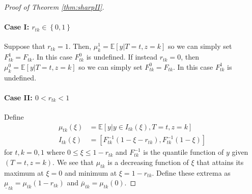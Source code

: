 \begin{proof}[Proof of Theorem \ref{thm:sharpII}]

\paragraph{Case I: $r_{tk}\in \left\{ 0,1 \right\}$}
Suppose that $r_{tk} = 1$.
Then, $\mu^1_k = \mathbb{E}[y|T=t,z=k]$ so we can simply set $F^1_{tk} = F_{tk}$.
In this case $F^0_{tk}$ is undefined.
If instead $r_{tk} = 0$, then $\mu^0_k = \mathbb{E}[y|T=t,z=k]$ so we can simply set $F^0_{tk} = F_{tk}$.
In this case $F^1_{tk}$ is undefined.

\paragraph{Case II: $0 < r_{tk} < 1$} 
Define
\begin{align*}
  \mu_{tk}(\xi) &= \mathbb{E}[y|y\in I_{tk}(\xi), T=t, z=k]\\
  I_{tk}(\xi) &= \left[ F^{-1}_{tk}(1 - \xi - r_{tk}), F^{-1}_{tk}(1 - \xi) \right]
\end{align*}
for $t,k = 0,1$ where $0 \leq \xi \leq 1 - r_{tk}$ and $F^{-1}_{tk}$ is the quantile function of $y$ given $(T=t, z=k)$.
We see that $\mu_{tk}$ is a decreasing function of $\xi$ that attains its maximum at $\xi = 0$ and minimum at $\xi = 1 - r_{tk}$.
Define these extrema as $\underline{\mu}_{tk} = \mu_{tk}(1 - r_{tk})$ and $\overline{\mu}_{tk} = \mu_{tk}(0)$.


\end{proof}
